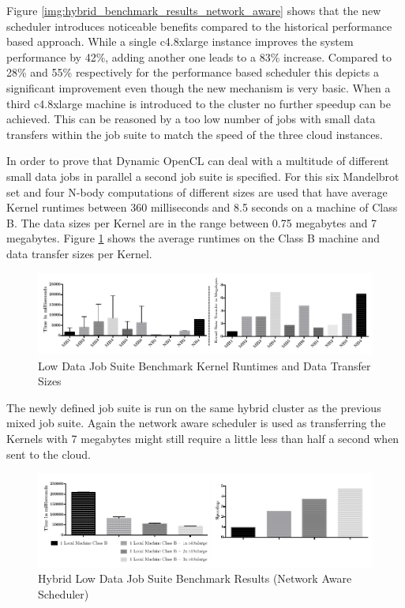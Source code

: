 Figure \ref{img:hybrid_benchmark_results_network_aware} shows that the new scheduler introduces noticeable benefits compared to the historical performance based approach. While a single c4.8xlarge instance improves the system performance by 42\%, adding another one leads to a 83\% increase. Compared to 28\% and 55\% respectively for the performance based scheduler this depicts a significant improvement even though the new mechanism is very basic. When a third c4.8xlarge machine is introduced to the cluster no further speedup can be achieved. This can be reasoned by a too low number of jobs with small data transfers within the job suite to match the speed of the three cloud instances.

In order to prove that Dynamic OpenCL can deal with a multitude of different small data jobs in parallel a second job suite is specified. For this six Mandelbrot set and four N-body computations of different sizes are used that have average Kernel runtimes between 360 milliseconds and 8.5 seconds on a machine of Class B. The data sizes per Kernel are in the range between 0.75 megabytes and 7 megabytes. Figure \ref{img:low_data_benchmark_statistics} shows the average runtimes on the Class B machine and data transfer sizes per Kernel.

\begin{figure}[H]	
	\includegraphics[width=1.0\textwidth]{images/lowdata_benchmark_statistics.pdf}
	\centering
	\caption{Low Data Job Suite Benchmark Kernel Runtimes and Data Transfer Sizes}
	\label{img:low_data_benchmark_statistics}
\end{figure}

The newly defined job suite is run on the same hybrid cluster as the previous mixed job suite. Again the network aware scheduler is used as transferring the Kernels with 7 megabytes might still require a little less than half a second when sent to the cloud.

\begin{figure}[H]	
	\includegraphics[width=1.0\textwidth]{images/hybrid_lowdata_benchmark.pdf}
	\centering
	\caption{Hybrid Low Data Job Suite Benchmark Results (Network Aware Scheduler)}
	\label{img:hybrid_low_data_benchmark_results_network_aware}
\end{figure}

